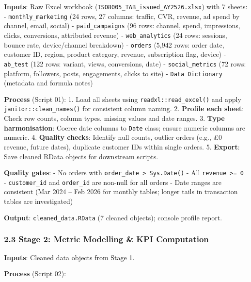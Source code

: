 \documentclass[
  11pt,
]{article}
\begin{document}
\textbf{Inputs}: Raw Excel workbook
(\texttt{ISO8005\_TAB\_issued\_AY2526.xlsx}) with 7 sheets: -
\texttt{monthly\_marketing} (24 rows, 27 columns: traffic, CVR, revenue,
ad spend by channel, email, social) - \texttt{paid\_campaigns} (96 rows:
channel, spend, impressions, clicks, conversions, attributed revenue) -
\texttt{web\_analytics} (24 rows: sessions, bounce rate, device/channel
breakdown) - \texttt{orders} (5,942 rows: order date, customer ID,
region, product category, revenue, subscription flag, device) -
\texttt{ab\_test} (122 rows: variant, views, conversions, date) -
\texttt{social\_metrics} (72 rows: platform, followers, posts,
engagements, clicks to site) - \texttt{Data\ Dictionary} (metadata and
formula notes)

\textbf{Process} (Script 01): 1. Load all sheets using
\texttt{readxl::read\_excel()} and apply
\texttt{janitor::clean\_names()} for consistent column naming. 2.
\textbf{Profile each sheet}: Check row counts, column types, missing
values and date ranges. 3. \textbf{Type harmonisation}: Coerce date
columns to \texttt{Date} class; ensure numeric columns are numeric. 4.
\textbf{Quality checks}: Identify null counts, outlier orders (e.g., £0
revenue, future dates), duplicate customer IDs within single orders. 5.
\textbf{Export}: Save cleaned RData objects for downstream scripts.

\textbf{Quality gates}: - No orders with
\texttt{order\_date\ \textgreater{}\ Sys.Date()} - All
\texttt{revenue\ \textgreater{}=\ 0} - \texttt{customer\_id} and
\texttt{order\_id} are non-null for all orders - Date ranges are
consistent (Mar 2024 -- Feb 2026 for monthly tables; longer tails in
transaction tables are investigated)

\textbf{Output}: \texttt{cleaned\_data.RData} (7 cleaned objects);
console profile report.

\subsubsection{2.3 Stage 2: Metric Modelling \& KPI
Computation}\label{stage-2-metric-modelling-kpi-computation}

\textbf{Inputs}: Cleaned data objects from Stage 1.

\textbf{Process} (Script 02):
\end{document}
